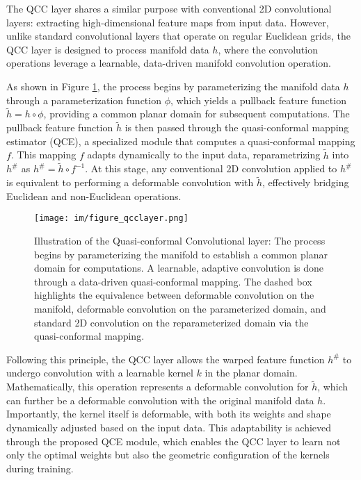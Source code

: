 The QCC layer shares a similar purpose with conventional 2D convolutional layers: extracting high-dimensional feature maps from input data. However, unlike standard convolutional layers that operate on regular Euclidean grids, the QCC layer is designed to process manifold data $h$, where the convolution operations leverage a learnable, data-driven manifold convolution operation.

As shown in Figure \ref{fig:qcclayer}, the process begins by parameterizing the manifold data $ h $ through a parameterization function $ \phi$, which yields a pullback feature function $ \tilde{h} = h \circ \phi $, providing a common planar domain for subsequent computations. The pullback feature function $ \tilde{h} $ is then passed through the quasi-conformal mapping estimator (QCE), a specialized module that computes a quasi-conformal mapping $ f $. This mapping $ f $ adapts dynamically to the input data, reparametrizing $ \tilde{h} $ into $ h^\# $ as $ h^\# = \tilde{h} \circ f^{-1} $. At this stage, any conventional 2D convolution applied to $ h^\# $ is equivalent to performing a deformable convolution with $ \tilde{h} $, effectively bridging Euclidean and non-Euclidean operations.

\begin{figure}
    \centering
    \texttt{[image: im/figure\_qcclayer.png]}
    \caption{Illustration of the Quasi-conformal Convolutional layer: The process begins by parameterizing the manifold to establish a common planar domain for computations. A learnable, adaptive convolution is done through a data-driven quasi-conformal mapping. The dashed box highlights the equivalence between deformable convolution on the manifold, deformable convolution on the parameterized domain, and standard 2D convolution on the reparameterized domain via the quasi-conformal mapping.}
    \label{fig:qcclayer}
\end{figure}

Following this principle, the QCC layer allows the warped feature function $ h^\# $ to undergo convolution with a learnable kernel $ k $ in the planar domain. Mathematically, this operation represents a deformable convolution for $ \tilde{h} $, which can further be a deformable convolution with the original manifold data $ h $. Importantly, the kernel itself is deformable, with both its weights and shape dynamically adjusted based on the input data. This adaptability is achieved through the proposed QCE module, which enables the QCC layer to learn not only the optimal weights but also the geometric configuration of the kernels during training.

